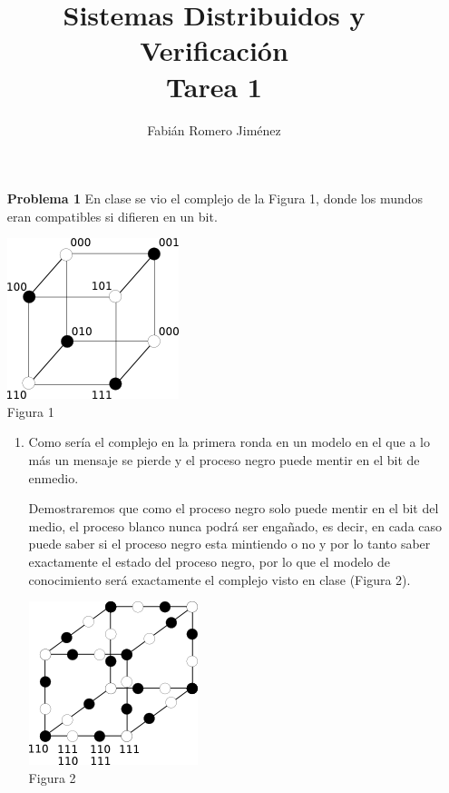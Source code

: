\documentclass{article}
\title{Sistemas Distribuidos y Verificación \\ Tarea 1}
\author{Fabián Romero Jiménez}
\begin{document}
\maketitle

\begin{enumerate}

\item[\bf{Problema 1}] En clase se vio el complejo de la Figura 1, donde los mundos eran compatibles si difieren en un bit.\\

\begin{center}
  \includegraphics{cubo1.png}\\
  Figura 1
\end{center}

\begin{enumerate}

\item Como sería el complejo en la primera ronda en un modelo en el que a lo más un mensaje se pierde y el proceso negro puede mentir en el bit de enmedio.

Demostraremos que como el proceso negro solo puede mentir en el bit del medio, el proceso blanco nunca podrá ser engañado, es decir, en cada caso puede saber si el proceso negro esta mintiendo o no y por lo tanto saber exactamente el estado del proceso negro, por lo que el modelo de conocimiento será exactamente el complejo visto en clase (Figura 2).\\

\begin{center}
  \includegraphics{cubo2.png}\\
  Figura 2
\end{center}


\end{enumerate}
\end{enumerate}
\end{document}
